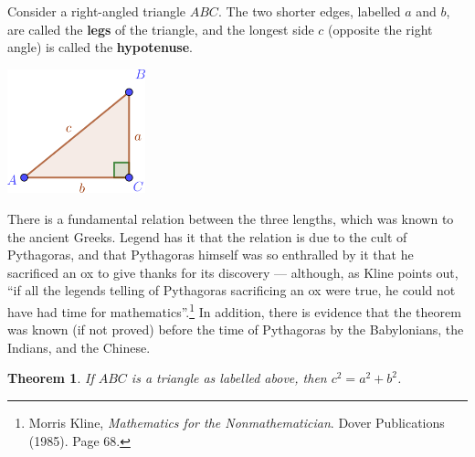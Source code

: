 \documentclass[a4paper,leqno]{article}
\numberwithin{equation}{section}
\newtheorem{thm}[equation]{Theorem}
\theoremstyle{definition}
\theoremstyle{remark}
\newcommand{\df}[1]{\textbf{#1}}
\begin{document}
Consider a right-angled triangle $ ABC $. The two shorter edges, labelled $ a $ and $ b $, are called the \df{legs} of the triangle,
and the longest side $ c $ (opposite the right angle) is called the \df{hypotenuse}.

\begin{center}
  \includegraphics[width=0.3\textwidth]{pythag1}
\end{center}

There is a fundamental relation between the three lengths, which was known to the ancient Greeks. Legend has it that the relation
is due to the cult of Pythagoras, and that Pythagoras himself was so enthralled by it that he sacrificed an ox to give thanks for
its discovery --- although, as Kline points out, ``if all the legends telling of Pythagoras sacrificing an ox were true, he could
not have had time for mathematics''.\footnote{Morris Kline, \emph{Mathematics for the Nonmathematician}. Dover Publications (1985). Page 68.} In
addition, there is evidence that the theorem was known (if not proved) before the time of Pythagoras by the Babylonians, the Indians,
and the Chinese.

\begin{thm}
  If $ ABC $ is a triangle as labelled above, then $ c^2 = a^2 + b^2 $.
\end{thm}
\end{document}
